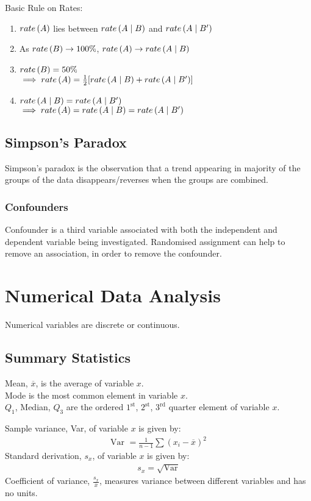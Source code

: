 \documentclass[12pt, a4paper]{article}
\begin{document}
\begin{multicols*}{3}
Basic Rule on Rates:
\begin{enumerate}[\roman*.]
  \item $\mathord{rate} \left( A \right)$ lies between $\mathord{rate} \left( A\mid B \right)$ and $\mathord{rate} \left( A\mid B' \right)$
  \item As $\mathord{rate} \left( B \right) \rightarrow 100\%$, $\mathord{rate} \left( A \right) \rightarrow \mathord{rate} \left( A\mid B \right)$
  \item $\mathord{rate} \left( B \right) = 50\%$ \\$\implies \mathord{rate} \left( A \right) = \frac{1}{2}[\mathord{rate} \left( A\mid B \right) + \mathord{rate} \left( A\mid B' \right)]$
  \item $\mathord{rate} \left( A\mid B \right) = \mathord{rate} \left( A\mid B' \right)$\\$\implies \mathord{rate} \left( A \right) = \mathord{rate} \left( A\mid B \right) = \mathord{rate} \left( A\mid B' \right)$
\end{enumerate}

\subsection{Simpson's Paradox}
Simpson's paradox is the observation that a trend appearing in majority of the groups of the data disappears/reverses when the groups are combined.

\subsubsection{Confounders}
Confounder is a third variable associated with both the independent and dependent variable being investigated. Randomised assignment can help to remove an association, in order to remove the confounder.

\section{Numerical Data Analysis}
Numerical variables are discrete or continuous.

\subsection{Summary Statistics}
Mean, $\overline{x}$, is the average of variable $x$.\\
Mode is the most common element in variable $x$.\\
$Q_1$, Median, $Q_3$ are the ordered  $1^{\text{st}}$, $2^{\text{st}}$, $3^{\text{rd}}$ quarter element of variable $x$.

Sample variance, Var, of variable $x$ is given by: 
\begin{align*}
  \text{Var }= \frac{1}{n-1}\sum (x_i-\overline{x})^2
\end{align*}
Standard derivation, $s_x$, of variable $x$ is given by:
\begin{align*}
  s_x = \sqrt{\text{Var}}
\end{align*}
Coefficient of variance, $\displaystyle \frac{s_x}{\overline{x}}$, measures variance between different variables and has no units.


\end{multicols*}
\end{document}
